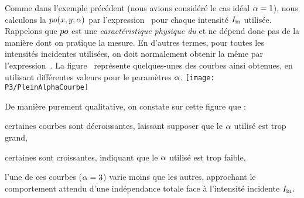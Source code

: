 %
Comme dans l'exemple précédent (nous avions considéré le cas idéal ${\alpha}=1$), nous calculons la \pro ${ po}{(x,y;{\alpha})}$ par l'expression~ pour chaque intensité ${{I}_{\rm in}}$ utilisée.
Rappelons que ${ po}$ est une \emph{caractéristique physique du \n} et ne dépend donc pas de la manière dont on pratique la mesure. En d'autres termes, pour toutes les intensités incidentes utilisées, on doit normalement obtenir la même \pro par l'expression~.
La figure~ représente quelques-unes des courbes ainsi obtenues, en utilisant différentes valeurs pour le paramètres ${\alpha}$.
\bfighs
\texttt{[image: P3/PleinAlphaCourbe]}
\label{fig:PleinAlphaCourbe}
\efigh
{}

\noindent De manière purement qualitative, on constate sur cette figure que :
\begin{itemizel}
	\item certaines courbes sont décroissantes, laissant supposer que le ${\alpha}$ utilisé est trop grand, 
	\item certaines sont croissantes, indiquant que le ${\alpha}$ utilisé est trop faible,
	\item l'une de ces courbes (${\alpha} = 3$) varie moins que les autres, approchant le comportement attendu d'une indépendance totale face à l'intensité incidente ${{I}_{\rm in}}$.
\end{itemizel}

